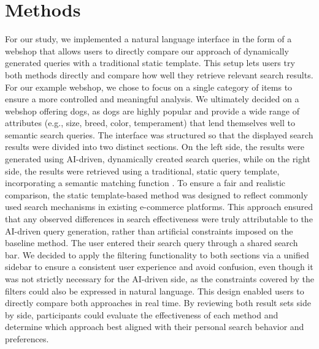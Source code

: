 \documentclass[../../submission.tex]{subfiles}
\begin{document}
\section{Methods}
For our study, we implemented a natural language interface in the 
form of a webshop that allows users to directly compare our approach 
of dynamically generated queries with a traditional static template. 
This setup lets users try both methods directly and compare how well 
they retrieve relevant search results. For our example webshop, we 
chose to focus on a single category of items to ensure a more controlled 
and meaningful analysis. We ultimately decided on a webshop offering dogs, 
as dogs are highly popular and provide a wide range of attributes 
(e.g., size, breed, color, temperament) that lend themselves well 
to semantic search queries.
The interface was structured so that the displayed search results 
were divided into two distinct sections. On the left side, the results 
were generated using AI-driven, dynamically created search queries, 
while on the right side, the results were retrieved using a traditional, 
static query template, incorporating a semantic matching function . To 
ensure a fair and realistic comparison, the static template-based method 
was designed to reflect commonly used search mechanisms in existing e-commerce platforms. 
This approach ensured that any observed differences in search effectiveness were truly 
attributable to the AI-driven query generation, rather than artificial constraints imposed on the baseline method.
The user entered their search query through a shared search bar. We decided to apply 
the filtering functionality to both sections via a unified sidebar to ensure a 
consistent user experience and avoid confusion, even though it was not strictly 
necessary for the AI-driven side, as the constraints covered by the filters could 
also be expressed in natural language. This design enabled users to directly 
compare both approaches in real time. By reviewing both result sets side by side, participants 
could evaluate the effectiveness of each method and determine which approach best aligned 
with their personal search behavior and preferences.
\end{document}
